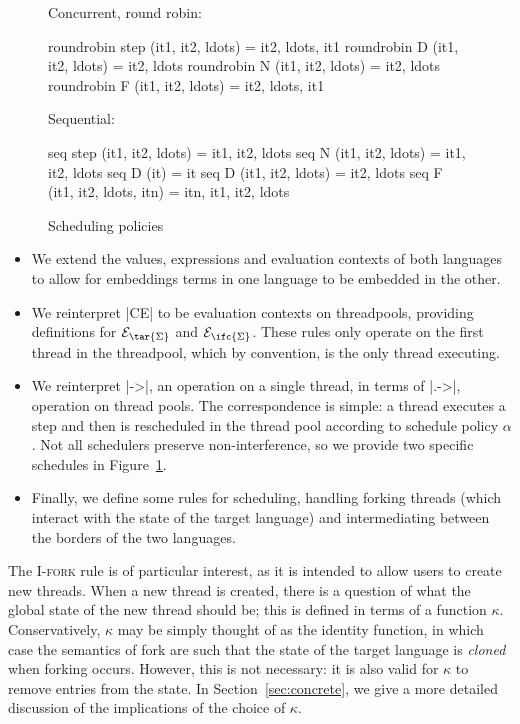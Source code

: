 \begin{figure}
  Concurrent, round robin:
\begin{code}
  roundrobin step (it1, it2, ldots)  = it2, ldots, it1
  roundrobin D (it1, it2, ldots)     = it2, ldots
  roundrobin N (it1, it2, ldots)     = it2, ldots
  roundrobin F (it1, it2, ldots)     = it2, ldots, it1
\end{code}
  Sequential:
\begin{code}
  seq step (it1, it2, ldots)     = it1, it2, ldots
  seq N (it1, it2, ldots)        = it1, it2, ldots
  seq D (it)                     = it
  seq D (it1, it2, ldots)        = it2, ldots
  seq F (it1, it2, ldots, itn)   = itn, it1, it2, ldots
\end{code}
\caption{Scheduling policies}
\label{fig:scheduler}
\end{figure}

\begin{itemize}
    \item We extend the values, expressions and evaluation contexts of both languages to allow for embeddings terms in one language to be embedded in the other.
    \item We reinterpret |CE| to be evaluation contexts on threadpools, providing definitions for $\mathcal{E}_{\tar{\Sigma}}$ and $\mathcal{E}_{\ifc{\Sigma}}$.  These rules only operate on the first thread in the threadpool, which by convention, is the only thread executing.
    \item We reinterpret |->|, an operation on a single thread, in terms of |.->|, operation on thread pools.  The correspondence is simple: a thread executes a step and then is rescheduled in the thread pool according to schedule policy $\alpha$.  Not all schedulers preserve non-interference, so we provide two specific schedules in Figure~\ref{fig:scheduler}.
    \item Finally, we define some rules for scheduling, handling forking threads (which interact with the state of the target language) and intermediating between the borders of the two languages.
\end{itemize}

The \textsc{I-fork} rule is of particular interest, as it is intended to allow users
to create new threads.  When a new thread is created, there is a question of what the
global state of the new thread should be; this is defined in terms of a function $\kappa$.
Conservatively, $\kappa$ may be simply thought of as the identity function, in which
case the semantics of fork are such that the state of the target language is \emph{cloned}
when forking occurs.  However, this is not necessary: it is also valid for $\kappa$
to remove entries from the state.  In Section~\ref{sec:concrete}, we give a more detailed
discussion of the implications of the choice of $\kappa$.


